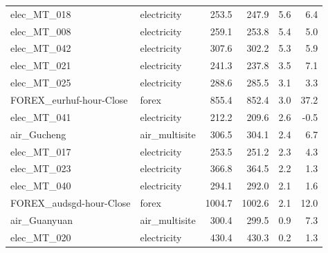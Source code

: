 \begin{longtable}{@{}l l r r r r@{}}
elec\_MT\_018 & electricity & 253.5 & 247.9 & 5.6 & 6.4 \\
elec\_MT\_008 & electricity & 259.1 & 253.8 & 5.4 & 5.0 \\
elec\_MT\_042 & electricity & 307.6 & 302.2 & 5.3 & 5.9 \\
elec\_MT\_021 & electricity & 241.3 & 237.8 & 3.5 & 7.1 \\
elec\_MT\_025 & electricity & 288.6 & 285.5 & 3.1 & 3.3 \\
FOREX\_eurhuf-hour-Close & forex & 855.4 & 852.4 & 3.0 & 37.2 \\
elec\_MT\_041 & electricity & 212.2 & 209.6 & 2.6 & -0.5 \\
air\_Gucheng & air\_multisite & 306.5 & 304.1 & 2.4 & 6.7 \\
elec\_MT\_017 & electricity & 253.5 & 251.2 & 2.3 & 4.3 \\
elec\_MT\_023 & electricity & 366.8 & 364.5 & 2.2 & 1.3 \\
elec\_MT\_040 & electricity & 294.1 & 292.0 & 2.1 & 1.6 \\
FOREX\_audsgd-hour-Close & forex & 1004.7 & 1002.6 & 2.1 & 12.0 \\
air\_Guanyuan & air\_multisite & 300.4 & 299.5 & 0.9 & 7.3 \\
elec\_MT\_020 & electricity & 430.4 & 430.3 & 0.2 & 1.3 \\
\end{longtable}
